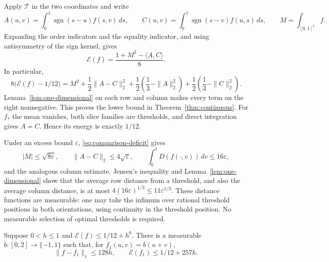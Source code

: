 Apply $\mathcal T$ in the two coordinates and write
\[
 A(u,v)=\int_0^1\operatorname{sgn}(s-u)f(s,v)\,ds,
 \qquad
 C(u,v)=\int_0^1\operatorname{sgn}(s-v)f(u,s)\,ds,
 \qquad M=\int_{[0,1]^2}f.
\]
Expanding the order indicators and the equality indicator, and using
antisymmetry of the sign kernel, gives
\[
 \mathcal E(f)=\frac{1+M^2-\langle A,C\rangle}{8}.
\]
In particular,
\begin{equation}
 8\bigl(\mathcal E(f)-1/12\bigr)
 =M^2+\frac12\|A-C\|_2^2
 +\frac12\left(\frac13-\|A\|_2^2\right)
 +\frac12\left(\frac13-\|C\|_2^2\right).
 \label{eq:comparison-deficit}
\end{equation}
Lemma~\ref{lem:one-dimensional} on each row and column makes every term on
the right nonnegative.  This proves the lower bound in
Theorem~\ref{thm:continuous}.  For $f_*$ the mean vanishes, both slice
families are thresholds, and direct integration gives $A=C$.  Hence its
energy is exactly $1/12$.

Under an excess bound $\varepsilon$, \eqref{eq:comparison-deficit} gives
\begin{equation}
 |M|\le\sqrt{8\varepsilon},\qquad
 \|A-C\|_2\le4\sqrt\varepsilon,
 \qquad
 \int_0^1 D(f(\cdot,v))\,dv\le16\varepsilon,
 \label{eq:deficit-consequences}
\end{equation}
and the analogous column estimate.  Jensen's inequality and
Lemma~\ref{lem:one-dimensional} show that the average row distance from a
threshold, and also the average column distance, is at most
$4(16\varepsilon)^{1/3}\le11\varepsilon^{1/3}$.  These distance functions are
measurable: one may take the infimum over rational threshold positions in
both orientations, using continuity in the threshold position.  No
measurable selection of optimal thresholds is required.

\begin{lemma}
\label{lem:diagonal-approximation}
Suppose $0<h\le1$ and $\mathcal E(f)\le1/12+h^6$.  There is a measurable
$b:[0,2]\to\{-1,1\}$ such that, for $f_1(u,v)=b(u+v)$,
\[
 \|f-f_1\|_1\le128h,
 \qquad \mathcal E(f_1)\le1/12+257h.
\]
\end{lemma}

